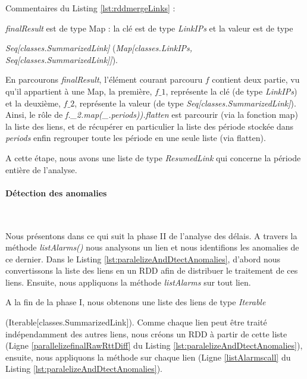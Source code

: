 Commentaires  du Listing \ref{lst:rddmergeLinks} :

\noindent \textit{finalResult} est de type Map  : la clé est de type \textit{LinkIPs} et la valeur est de type

\noindent \textit{Seq[classes.SummarizedLink]} (\textit{Map[classes.LinkIPs, Seq[classes.SummarizedLink]]}).

\noindent En parcourons  \textit{finalResult}, l'élément courant parcouru $f$ contient deux partie, vu qu'il appartient à une Map, la première, $ f\_1 $, représente la clé (de type \textit{LinkIPs})  et la deuxième,  $ f\_2 $, représente la valeur (de type  \textit{Seq[classes.SummarizedLink]}).  Ainsi, le rôle de \textit{f.\_2.map(\_.periods)).flatten} est parcourir (via la fonction map) la liste des liens, et de récupérer en particulier la liste des période stockée dans \textit{periods} enfin regrouper toute les période en une seule liste (via flatten).


A cette étape, nous avons une liste de type \textit{ResumedLink} qui concerne  la période entière de l'analyse. 



\paragraph{Détection des anomalies}~

Nous présentons dans ce qui suit la phase II de l'analyse des délais. A travers la méthode \textit{listAlarms()} nous analysons un lien et nous identifions les anomalies de ce dernier. Dans le Listing \ref{lst:paralelizeAndDtectAnomalies}, d'abord nous convertissons la liste des liens en un RDD afin de distribuer le traitement de ces liens. Ensuite, nous appliquons la méthode \textit{listAlarms} sur tout lien. 


A la fin de la phase I, nous obtenons une liste des liens de type \textit{Iterable}  

(Iterable[classes.SummarizedLink]). Comme chaque lien peut être traité indépendamment des autres liens, nous créons un RDD à partir de cette liste (Ligne \ref{parallelizefinalRawRttDiff} du Listing \ref{lst:paralelizeAndDtectAnomalies}), ensuite, nous appliquons la méthode sur chaque lien (Ligne \ref{listAlarmscall} du Listing \ref{lst:paralelizeAndDtectAnomalies}).  

